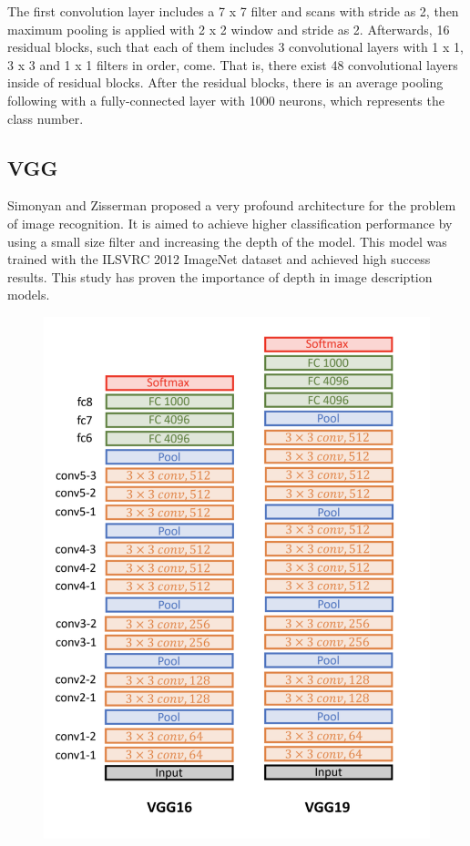 The first convolution layer includes a 7 x 7 filter and scans with stride as 2, then maximum pooling is applied with 2 x 2 window and stride as 2. Afterwards, 16 residual blocks, such that each of them includes 3 convolutional layers with 1 x 1, 3 x 3 and 1 x 1 filters in order, come. That is, there exist 48 convolutional layers inside of residual blocks. After the residual blocks, there is an average pooling following with a fully-connected layer with 1000 neurons, which represents the class number.

\subsection{VGG}

Simonyan and Zisserman \cite{VGG} proposed a very profound architecture for the problem of image recognition. It is aimed to achieve higher classification performance by using a small size filter and increasing the depth of the model. This model was trained with the ILSVRC 2012  ImageNet \cite{imagenet} dataset and achieved high success results. This study has proven the importance of depth in image description models.

\begin{figure}[h]
    \centering
    \includegraphics[width=.6\linewidth]{fig/vgg16_vgg19_archs.png}
    \label{fig:vgg16_vgg19_archs}
\end{figure}

